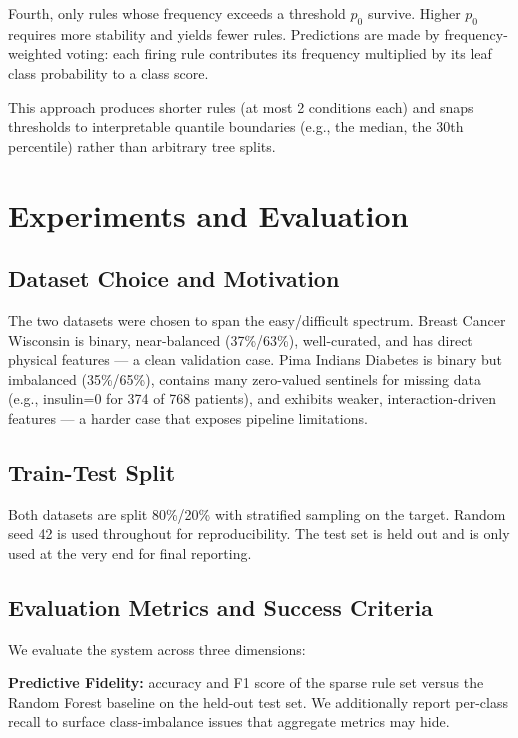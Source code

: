 \documentclass[11pt]{article}
\begin{document}
Fourth, only rules whose frequency exceeds a threshold $p_0$ survive. Higher $p_0$ requires more stability and yields fewer rules. Predictions are made by frequency-weighted voting: each firing rule contributes its frequency multiplied by its leaf class probability to a class score.

This approach produces shorter rules (at most 2 conditions each) and snaps thresholds to interpretable quantile boundaries (e.g., the median, the 30th percentile) rather than arbitrary tree splits.

\section{Experiments and Evaluation}

\subsection{Dataset Choice and Motivation}

The two datasets were chosen to span the easy/difficult spectrum. Breast Cancer Wisconsin is binary, near-balanced (37\%/63\%), well-curated, and has direct physical features --- a clean validation case. Pima Indians Diabetes is binary but imbalanced (35\%/65\%), contains many zero-valued sentinels for missing data (e.g., insulin=0 for 374 of 768 patients), and exhibits weaker, interaction-driven features --- a harder case that exposes pipeline limitations.

\subsection{Train-Test Split}

Both datasets are split 80\%/20\% with stratified sampling on the target. Random seed 42 is used throughout for reproducibility. The test set is held out and is only used at the very end for final reporting.

\subsection{Evaluation Metrics and Success Criteria}

We evaluate the system across three dimensions:

\textbf{Predictive Fidelity:} accuracy and F1 score of the sparse rule set versus the Random Forest baseline on the held-out test set. We additionally report per-class recall to surface class-imbalance issues that aggregate metrics may hide.
\end{document}
